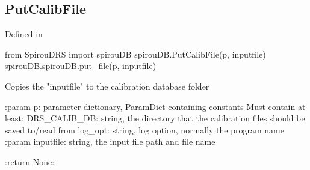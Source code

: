 \noindent\begin{minipage}{\textwidth}
\subsection{PutCalibFile}

Defined in \spirouCDB{}

\begin{pythonbox}
from SpirouDRS import spirouDB
spirouDB.PutCalibFile(p, inputfile)
spirouDB.spirouDB.put_file(p, inputfile)
\end{pythonbox}

\begin{pythondocstring}
Copies the "inputfile" to the calibration database folder

:param p: parameter dictionary, ParamDict containing constants
    Must contain at least:
            DRS_CALIB_DB: string, the directory that the calibration
                          files should be saved to/read from
            log_opt: string, log option, normally the program name
:param inputfile: string, the input file path and file name

:return None:
\end{pythondocstring}
\end{minipage}

